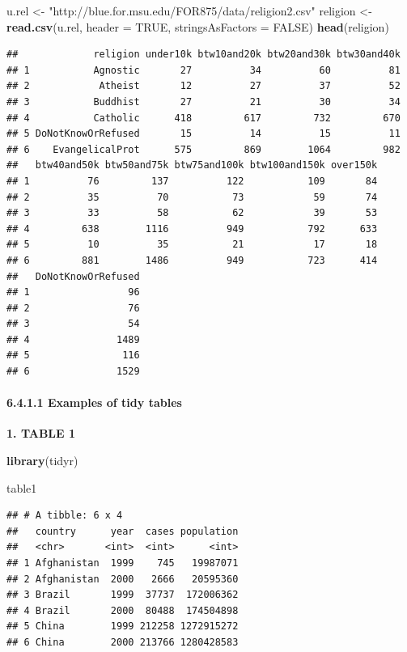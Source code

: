 \documentclass[]{article}
\newenvironment{Shaded}{\begin{snugshade}}{\end{snugshade}}
\newcommand{\KeywordTok}[1]{\textcolor[rgb]{0.13,0.29,0.53}{\textbf{#1}}}
\newcommand{\DataTypeTok}[1]{\textcolor[rgb]{0.13,0.29,0.53}{#1}}
\newcommand{\StringTok}[1]{\textcolor[rgb]{0.31,0.60,0.02}{#1}}
\newcommand{\OtherTok}[1]{\textcolor[rgb]{0.56,0.35,0.01}{#1}}
\newcommand{\NormalTok}[1]{#1}
\let\oldparagraph\paragraph
\renewcommand{\paragraph}[1]{\oldparagraph{#1}\mbox{}}
\begin{document}
\begin{Shaded}
\begin{Highlighting}[]
\NormalTok{u.rel <-}\StringTok{ "http://blue.for.msu.edu/FOR875/data/religion2.csv"}
\NormalTok{religion <-}\StringTok{ }\KeywordTok{read.csv}\NormalTok{(u.rel, }\DataTypeTok{header =} \OtherTok{TRUE}\NormalTok{, }\DataTypeTok{stringsAsFactors =} \OtherTok{FALSE}\NormalTok{)}
\KeywordTok{head}\NormalTok{(religion)}
\end{Highlighting}
\end{Shaded}

\begin{verbatim}
##             religion under10k btw10and20k btw20and30k btw30and40k
## 1           Agnostic       27          34          60          81
## 2            Atheist       12          27          37          52
## 3           Buddhist       27          21          30          34
## 4           Catholic      418         617         732         670
## 5 DoNotKnowOrRefused       15          14          15          11
## 6    EvangelicalProt      575         869        1064         982
##   btw40and50k btw50and75k btw75and100k btw100and150k over150k
## 1          76         137          122           109       84
## 2          35          70           73            59       74
## 3          33          58           62            39       53
## 4         638        1116          949           792      633
## 5          10          35           21            17       18
## 6         881        1486          949           723      414
##   DoNotKnowOrRefused
## 1                 96
## 2                 76
## 3                 54
## 4               1489
## 5                116
## 6               1529
\end{verbatim}

\paragraph{6.4.1.1 Examples of tidy
tables}\label{examples-of-tidy-tables}

\textbf{1. TABLE 1}

\begin{Shaded}
\begin{Highlighting}[]
\KeywordTok{library}\NormalTok{(tidyr)}

\NormalTok{table1}
\end{Highlighting}
\end{Shaded}

\begin{verbatim}
## # A tibble: 6 x 4
##   country      year  cases population
##   <chr>       <int>  <int>      <int>
## 1 Afghanistan  1999    745   19987071
## 2 Afghanistan  2000   2666   20595360
## 3 Brazil       1999  37737  172006362
## 4 Brazil       2000  80488  174504898
## 5 China        1999 212258 1272915272
## 6 China        2000 213766 1280428583
\end{verbatim}
\end{document}
